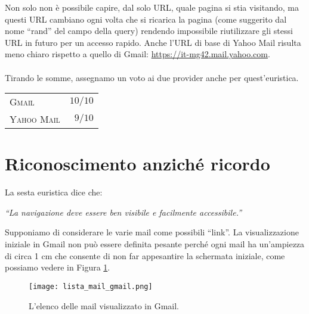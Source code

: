 		Non solo non è possibile capire, dal solo URL, quale pagina si stia visitando, ma questi URL cambiano ogni volta che si ricarica la pagina (come suggerito dal nome ``rand'' del campo della query) rendendo impossibile riutilizzare gli stessi URL in futuro per un accesso rapido. Anche l'URL di base di Yahoo Mail risulta meno chiaro rispetto a quello di Gmail: \url{https://it-mg42.mail.yahoo.com}.\\
		\\
		Tirando le somme, assegnamo un voto ai due provider anche per quest'euristica.
		
		\begin{flushleft}
			\begin{tabular}{lr}
				\textsc{Gmail} & $10/10$\\
				\textsc{Yahoo Mail} & $9/10$
			\end{tabular}
		\end{flushleft}
	
	\section{Riconoscimento anzich\'{e} ricordo} \label{sec:riconoscimento_anziché_ricordo}
	
		La sesta euristica dice che:
		\begin{center}
			\begin{minipage}{0.7\textwidth}
				\textit{``La navigazione deve essere ben visibile e facilmente accessibile.''}
			\end{minipage}
		\end{center}
		
		Supponiamo di considerare le varie mail come possibili ``link''. La visualizzazione iniziale in Gmail non può essere definita pesante perché ogni mail ha un'ampiezza di circa 1 cm che consente di non far appesantire la schermata iniziale, come possiamo vedere in Figura \ref{fig:lista_mail_gmail}.
		\begin{figure}[h!]
			\begin{center}
				\texttt{[image: lista\_mail\_gmail.png]}
			\end{center}
			\caption[Elenco mail in Gmail]{L'elenco delle mail visualizzato in Gmail.}
			\label{fig:lista_mail_gmail}
		\end{figure}
		
